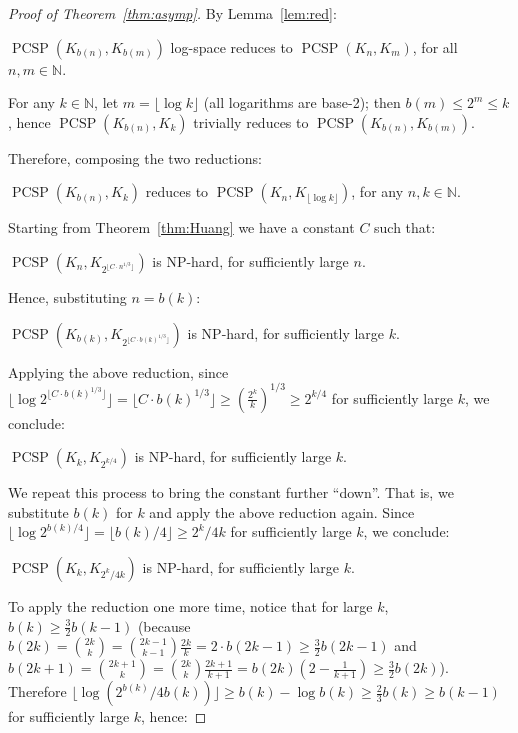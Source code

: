 \documentclass[11pt,a4paper]{scrartcl}
\numberwithin{theorem}{section}
\theoremstyle{definition}
\newcommand{\NN}{\mathbb{N}}
\DeclareMathOperator{\PCSP}{PCSP}
\begin{document}
\begin{proof}[Proof of Theorem~\ref{thm:asymp}]
	By Lemma~\ref{lem:red}:
	\begin{center}
	 $\PCSP(K_{b(n)},K_{b(m)})$ log-space reduces to $\PCSP(K_n, K_m)$, for all $n,m \in \NN$.
	\end{center}
	For any $k \in \NN$, let $m = \lfloor \log k\rfloor$ (all logarithms are base-2); then $b(m) \leq 2^m \leq k$,
	hence $\PCSP(K_{b(n)},K_{k})$ trivially reduces to $\PCSP(K_{b(n)},K_{b(m)})$.

	Therefore, composing the two reductions:
	\begin{center}	
	$\PCSP(K_{b(n)},K_{k})$ reduces to $\PCSP(K_{n},K_{\lfloor \log k \rfloor})$, for any $n,k \in \NN$.
	\end{center}
	Starting from Theorem~\ref{thm:Huang} we have a constant $C$ such that:
	\begin{center}
		$\PCSP(K_{n}, K_{2^{\lfloor C \cdot n^{1/3}\rfloor}})$ is NP-hard, for sufficiently large $n$.
	\end{center}	
	Hence, substituting $n=b(k)$:
	\begin{center}
		 $\PCSP(K_{b(k)}, K_{2^{\lfloor C \cdot b(k)^{1/3}\rfloor }})$ is NP-hard, for sufficiently large $k$.
	\end{center}
	Applying the above reduction, since $\lfloor \log 2^{\lfloor C \cdot b(k)^{1/3}\rfloor} \rfloor = \lfloor C \cdot b(k)^{1/3}\rfloor \geq (\frac{2^k}{k})^{1/3}\geq 2^{k/4}$ for sufficiently large $k$, we conclude:
	\begin{center}
		$\PCSP(K_{k}, K_{2^{k/4}})$ is NP-hard, for sufficiently large $k$.
	\end{center}
	We repeat this process to bring the constant further ``down''.
	That is, we substitute $b(k)$ for $k$ and apply the above reduction again.
	Since $\lfloor \log 2^{b(k)/4} \rfloor = \lfloor b(k)/4 \rfloor \geq 2^k/4k$ for sufficiently large $k$, we conclude:
	\begin{center}
	$\PCSP(K_{k}, K_{2^{k}/4k})$ is NP-hard, for sufficiently large $k$.
	\end{center}
	To apply the reduction one more time, notice that for large $k$, $b(k) \geq \frac{3}{2} b(k-1)$ (because $b(2k) = \binom{2k}{k} = \binom{2k-1}{k-1} \frac{2k}{k} = 2 \cdot b(2k-1) \geq \frac{3}{2} b(2k-1)$ and $b(2k+1) = \binom{2k+1}{k} = \binom{2k}{k} \frac{2k+1}{k+1} = b(2k) (2-\frac{1}{k+1})\geq \frac{3}{2} b(2k)$).
	Therefore $\lfloor \log (2^{b(k)}/4b(k)) \rfloor \geq b(k) - \log b(k) \geq \frac{2}{3} b(k) \geq b(k-1)$ for sufficiently large $k$, hence:

\end{proof}
\end{document}
